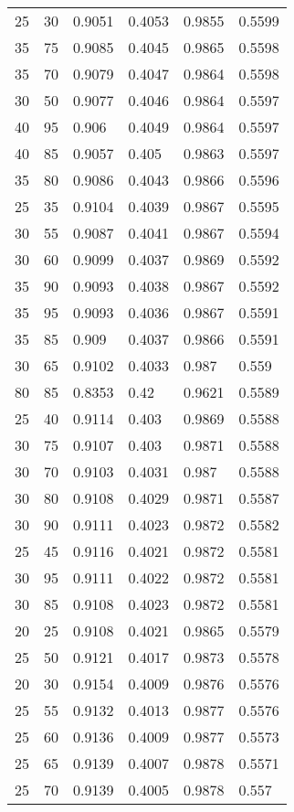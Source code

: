 \begin{center}
\begin{longtable}{|l|l|l|l|l|l|}
25 & 30 & 0.9051 & 0.4053 & 0.9855 & 0.5599 \\
35 & 75 & 0.9085 & 0.4045 & 0.9865 & 0.5598 \\
35 & 70 & 0.9079 & 0.4047 & 0.9864 & 0.5598 \\
30 & 50 & 0.9077 & 0.4046 & 0.9864 & 0.5597 \\
40 & 95 & 0.906  & 0.4049 & 0.9864 & 0.5597 \\
40 & 85 & 0.9057 & 0.405  & 0.9863 & 0.5597 \\
35 & 80 & 0.9086 & 0.4043 & 0.9866 & 0.5596 \\
25 & 35 & 0.9104 & 0.4039 & 0.9867 & 0.5595 \\
30 & 55 & 0.9087 & 0.4041 & 0.9867 & 0.5594 \\
30 & 60 & 0.9099 & 0.4037 & 0.9869 & 0.5592 \\
35 & 90 & 0.9093 & 0.4038 & 0.9867 & 0.5592 \\
35 & 95 & 0.9093 & 0.4036 & 0.9867 & 0.5591 \\
35 & 85 & 0.909  & 0.4037 & 0.9866 & 0.5591 \\
30 & 65 & 0.9102 & 0.4033 & 0.987  & 0.559  \\
80 & 85 & 0.8353 & 0.42   & 0.9621 & 0.5589 \\
25 & 40 & 0.9114 & 0.403  & 0.9869 & 0.5588 \\
30 & 75 & 0.9107 & 0.403  & 0.9871 & 0.5588 \\
30 & 70 & 0.9103 & 0.4031 & 0.987  & 0.5588 \\
30 & 80 & 0.9108 & 0.4029 & 0.9871 & 0.5587 \\
30 & 90 & 0.9111 & 0.4023 & 0.9872 & 0.5582 \\
25 & 45 & 0.9116 & 0.4021 & 0.9872 & 0.5581 \\
30 & 95 & 0.9111 & 0.4022 & 0.9872 & 0.5581 \\
30 & 85 & 0.9108 & 0.4023 & 0.9872 & 0.5581 \\
20 & 25 & 0.9108 & 0.4021 & 0.9865 & 0.5579 \\
25 & 50 & 0.9121 & 0.4017 & 0.9873 & 0.5578 \\
20 & 30 & 0.9154 & 0.4009 & 0.9876 & 0.5576 \\
25 & 55 & 0.9132 & 0.4013 & 0.9877 & 0.5576 \\
25 & 60 & 0.9136 & 0.4009 & 0.9877 & 0.5573 \\
25 & 65 & 0.9139 & 0.4007 & 0.9878 & 0.5571 \\
25 & 70 & 0.9139 & 0.4005 & 0.9878 & 0.557  \\

\end{longtable}
\end{center}
